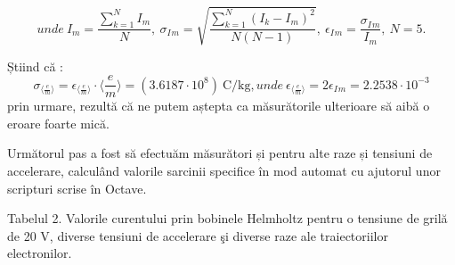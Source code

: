 \documentclass{article}
\begin{document}
\begin{equation*}
    unde \ {I}{_m} = \frac{\sum_{k=1}^{N} {I}{_m}}{N}, \ 
    {\sigma}{_{I}{_m}} = \sqrt{\frac{\sum_{k=1}^{N} ({I}{_k}-{I}{_m})^2}{N(N-1)}}, \
    {\epsilon}{_{I}{_m}} = \frac{{\sigma}{_{I}{_m}}}{{I}{_m}}, \ N = 5.
\end{equation*}
\raggedright
Știind că :
\begin{equation*}
    {\sigma}{_{\langle\frac{e}{m}\rangle}} = {\epsilon}{_{\langle\frac{e}{m}\rangle}} \cdot {\langle\frac{e}{m}\rangle} = (3.6187 \cdot 10^8) \ \si{\coulomb}/\si{\kg}, unde
    \ {\epsilon}{_{\langle\frac{e}{m}\rangle}} = 2{\epsilon}{_{I}{_m}} = 2.2538 \cdot 10^{-3}
\end{equation*}
prin urmare, rezultă că ne putem aștepta ca măsurătorile ulterioare să aibă o eroare foarte mică.

\hfill

\makebox[1.2cm]{} Următorul pas a fost să efectuăm măsurători și pentru alte raze și tensiuni de 
accelerare, calculând valorile sarcinii specifice în mod automat cu ajutorul unor scripturi
scrise în Octave. \newline

\centering
    Tabelul 2. Valorile curentului prin bobinele Helmholtz pentru o tensiune de grilă
    de 20 $\si{\volt}$, diverse tensiuni de accelerare şi diverse raze ale traiectoriilor electronilor.
\end{document}
